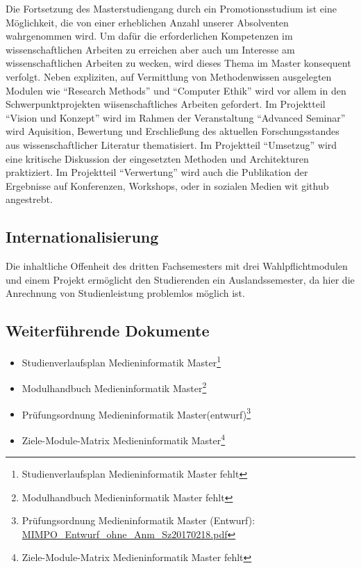Die Fortsetzung des Masterstudiengang durch ein Promotionsstudium ist
eine Möglichkeit, die von einer erheblichen Anzahl unserer Absolventen
wahrgenommen wird. Um dafür die erforderlichen Kompetenzen im
wissenschaftlichen Arbeiten zu erreichen aber auch um Interesse am
wissenschaftlichen Arbeiten zu wecken, wird dieses Thema im Master
konsequent verfolgt. Neben expliziten, auf Vermittlung von
Methodenwissen ausgelegten Modulen wie ``Research Methods'' und
``Computer Ethik'' wird vor allem in den Schwerpunktprojekten
wiisenschaftliches Arbeiten gefordert. Im Projektteil ``Vision und
Konzept'' wird im Rahmen der Veranstaltung ``Advanced Seminar'' wird
Aquisition, Bewertung und Erschließung des aktuellen Forschungsstandes
aus wissenschaftlicher Literatur thematisiert. Im Projektteil
``Umsetzug'' wird eine kritische Diskussion der eingesetzten Methoden
und Architekturen praktiziert. Im Projektteil ``Verwertung'' wird auch
die Publikation der Ergebnisse auf Konferenzen, Workshops, oder in
sozialen Medien wit github angestrebt.

\subsection{Internationalisierung}\label{internationalisierung}

Die inhaltliche Offenheit des dritten Fachsemesters mit drei
Wahlpflichtmodulen und einem Projekt ermöglicht den Studierenden ein
Auslandssemester, da hier die Anrechnung von Studienleistung problemlos
möglich ist.

\subsection{Weiterführende
Dokumente}\label{weiterfuxfchrende-dokumente-3}

\begin{itemize}
\tightlist
\item
  Studienverlaufsplan Medieninformatik Master\footnote{Studienverlaufsplan
    Medieninformatik Master fehlt}
\item
  Modulhandbuch Medieninformatik Master\footnote{Modulhandbuch
    Medieninformatik Master fehlt}
\item
  Prüfungsordnung Medieninformatik Master(entwurf)\footnote{Prüfungsordnung
    Medieninformatik Master (Entwurf):
    \href{../anhaenge/MIMPO_Entwurf_ohne_Anm_Sz20170218.pdf}{MIMPO\_Entwurf\_ohne\_Anm\_Sz20170218.pdf}}
\item
  Ziele-Module-Matrix Medieninformatik Master\footnote{Ziele-Module-Matrix
    Medieninformatik Master fehlt}
\end{itemize}

